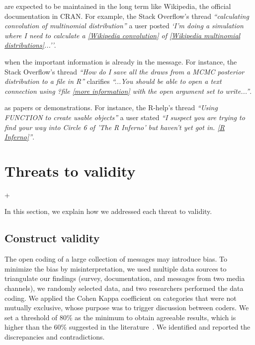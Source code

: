     \begin{description}[itemsep=3pt, topsep=2pt, leftmargin=3em, parsep=0pt]
        \item[Well known websites] are expected to be maintained in the long term like Wikipedia, the official documentation in CRAN.
        For example, the Stack Overflow's thread \textit{``calculating convolution of multinomial distribution''} a user posted \textit{`I'm doing a simulation where I need to calculate a \href{https://en.wikipedia.org/wiki/Convolution_of_probability_distributions}{[Wikipedia convolution]} of \href{https://en.wikipedia.org/wiki/Multinomial_distribution}{[Wikipedia multinomial distributions]}...''}.

        \item[Resources that support or expand the message] when the important information is already in the message.
        For instance, the Stack Overflow's thread \textit{``How do I save all the draws from a MCMC posterior distribution to a file in R''} clarifies \textit{``...You should be able to open a text connection using ?file \href{http://stat.ethz.ch/R-manual/R-devel/library/base/html/connections.html}{[more information]} with the open argument set to write...''}.

        \item[Material relevant to the message is too big] as papers or demonstrations.
        For instance, the R-help's thread \textit{``Using FUNCTION to create usable objects''} a user stated \textit{``I suspect you are trying to find your way into Circle 6 of 'The R Inferno' but haven't yet got in. \href{http://www.burns-stat.com/pages/Tutor/R\_inferno.pdf}{[R Inferno]}''}.
    \end{description}

\section{Threats to validity}+
\label{cha:threats}

    In this section, we explain how we addressed each threat to
    validity.

\subsection{Construct validity}

    The open coding of a large collection of messages may introduce bias.
    To minimize the bias by misinterpretation, we used multiple data sources to triangulate our findings (survey, documentation, and messages from two media channels), we randomly selected data, and two researchers performed the data coding.
    We applied the Cohen Kappa coefficient on categories that were not mutually exclusive, whose purpose  was to trigger discussion between coders.
    We set a threshold of 80\% as the minimum to obtain agreeable results, which is higher than the 60\% suggested in the literature~\cite{Landis1977}.
    We identified and reported the discrepancies and contradictions.

